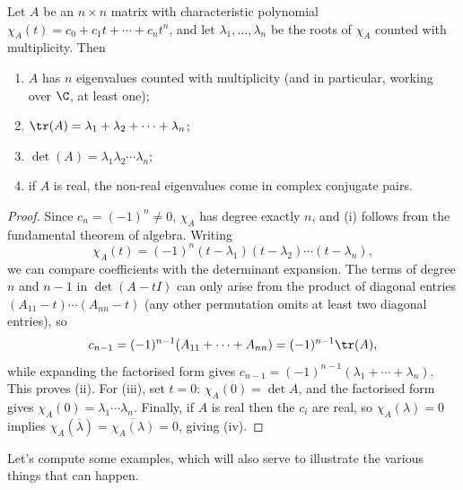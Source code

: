 \begin{proposition}
	Let $A$ be an $n \times n$ matrix with characteristic polynomial $\chi_A(t) = c_0 + c_1 t + \cdots + c_nt^n$, and let $\lambda_1, \dots, \lambda_n$ be the roots of $\chi_A$ counted with multiplicity. Then
	\begin{enumerate}[label=(\roman*)]
		\item $A$ has $n$ eigenvalues counted with multiplicity (and in particular, working over $\C$, at least one);
		\item $\tr (A) = \lambda_1 + \lambda_2 + \cdots + \lambda_n$;
		\item $\det(A) = \lambda_1 \lambda_2 \cdots \lambda_n$;
		\item if $A$ is real, the non-real eigenvalues come in complex conjugate pairs.
	\end{enumerate}
\end{proposition}
\begin{proof}
	Since $c_n = (-1)^n \neq 0$, $\chi_A$ has degree exactly $n$, and (i) follows from the fundamental theorem of algebra. Writing
	$$
	\chi_A(t) = (-1)^n (t - \lambda_1)(t - \lambda_2)\cdots(t - \lambda_n),
	$$
	we can compare coefficients with the determinant expansion. The terms of degree $n$ and $n - 1$ in $\det(A - tI)$ can only arise from the product of diagonal entries $(A_{11} - t) \cdots (A_{nn} - t)$ (any other permutation omits at least two diagonal entries), so
	$$
	c_{n - 1} = (-1)^{n-1}(A_{11} + \cdots + A_{nn}) = (-1)^{n-1}\tr(A),
	$$
	while expanding the factorised form gives $c_{n-1} = (-1)^{n-1}(\lambda_1 + \cdots + \lambda_n)$. This proves (ii). For (iii), set $t = 0$: $\chi_A(0) = \det A$, and the factorised form gives $\chi_A(0) = \lambda_1 \cdots \lambda_n$. Finally, if $A$ is real then the $c_i$ are real, so $\chi_A(\lambda) = 0$ implies $\chi_A(\overline{\lambda}) = \overline{\chi_A(\lambda)} = 0$, giving (iv).
\end{proof}

Let's compute some examples, which will also serve to illustrate the various things that can happen.

